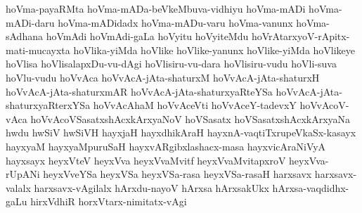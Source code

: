 {hoVma-payaRMta
hoVma-mADa-beVkeMbuva-vidhiyu
hoVma-mADi
hoVma-mADi-daru
hoVma-mADidadx
hoVma-mADu-varu
hoVma-vanunx
hoVma-sAdhana
hoVmAdi
hoVmAdi-gaLa
hoVyitu
hoVyiteMdu
hoVrAtarxyoV-rApitx-mati-mucayxta
hoVlika-yiMda
hoVlike
hoVlike-yanunx
hoVlike-yiMda
hoVlikeye
hoVlisa
hoVlisalapxDu-vu-dAgi
hoVlisiru-vu-dara
hoVlisiru-vudu
hoVli-suva
hoVlu-vudu
hoVvAca
hoVvAcA-jAta-shaturxM
hoVvAcA-jAta-shaturxH
hoVvAcA-jAta-shaturxmAR
hoVvAcA-jAta-shaturxyaRteYSa
hoVvAcA-jAta-shaturxyaRterxYSa
hoVvAcAhaM
hoVvAceVti
hoVvAceY-tadevxY
hoVvAcoV-vAca
hoVvAcoVSasatxshAcxkArxyaNoV
hoVSasatx
hoVSasatxshAcxkArxyaNa
hwdu
hwSiV
hwSiVH
hayxjaH
hayxdhikAraH
hayxnA-vaqtiTxrupeVkaSx-kasayx
hayxyaM
hayxyaMpuruSaH
hayxvARgibxlashacx-masa
hayxvicAraNiVyA
hayxsayx
heyxVteV
heyxVva
heyxVvaMvitf
heyxVvaMvitapxroV
heyxVva-rUpANi
heyxVveYSa
heyxVSa
heyxVSa-rasa
heyxVSa-rasaH
harxsavx
harxsavx-valalx
harxsavx-vAgilalx
hArxdu-nayoV
hArxsa
hArxsakUkx
hArxsa-vaqdidhx-gaLu
hirxVdhiR
horxVtarx-nimitatx-vAgi
}
